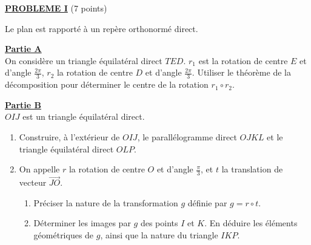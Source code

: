 \noindent \underline{\textsc{\textbf{PROBLEME I}}} (7 points) 

      Le plan est rapport\'e \`a un rep\`ere orthonorm\'e direct. 
      
      \underline{\textbf{Partie A}} \\
      On consid\`ere un triangle \'equilat\'eral direct $TED$.
      $r_1$ est la rotation de centre $E$ et d'angle $\frac{2\pi}{3}$,
      $r_2$ la rotation de centre $D$ et d'angle $\frac{2\pi}{3}$.
      Utiliser le th\'eor\`eme de la d\'ecomposition pour d\'eterminer le centre de la rotation $r_1 \circ r_2$.
      
      \underline{\textbf{Partie B}} \\
      $OIJ$ est un triangle \'equilat\'eral direct.
      \begin{enumerate}
            \item Construire, \`a l'ext\'erieur de $OIJ$, le parall\'elogramme direct $OJKL$ et 
                  le triangle \'equilat\'eral direct $OLP$.
            \item On appelle $r$ la rotation de centre $O$ et d'angle $\frac{\pi}{3}$, 
                  et $t$ la translation de vecteur $\overrightarrow{JO}$.
                  \begin{enumerate}
                        \item Pr\'eciser la nature de la transformation $g$ d\'efinie par $g = r \circ t$.
                        \item D\'eterminer les images par $g$ des points $I$ et $K$.
                              En d\'eduire les \'el\'ements g\'eom\'etriques de $g$, ainsi que la nature du triangle $IKP$.
                  \end{enumerate}
      \end{enumerate}
      
